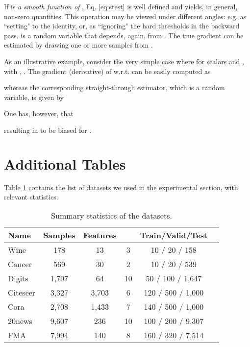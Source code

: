 \documentclass{article}
\begin{document}
If  is \emph{a smooth function of }, Eq. \ref{eq:stest} is well defined and yields, in general, non-zero quantities. This operation may be viewed under different angles: e.g. as ``setting"   to the identity, or, as ``ignoring" the hard thresholds in the backward pass.  is a random variable that depends, again, from . The true gradient  can be estimated by drawing one or more samples from . 

As an illustrative example, consider the very simple case where  for scalars  and , with , . The gradient (derivative) of  w.r.t.  can be easily computed as 

whereas the corresponding straight-through estimator, which is a random variable, is given by

One has, however, that 

resulting in  to be biased for .


\section{Additional Tables}

Table \ref{tb:data} contains the list of datasets we used in the experimental section, with relevant statistics.

\begin{table}[h]
\small
	\centering
	\vspace{-2mm}
	\caption{\label{tb:data}Summary statistics of the datasets.}
	\begin{tabular}{lccccc}
		\toprule Name & Samples & Features &  & Train/Valid/Test \\ \midrule
		Wine & 178 & 13 &  3 & 10 / 20 / 158 \\
		Cancer & 569 & 30 &  2 & 10 / 20 / 539 \\
		Digits & 1,797 & 64 &  10 & 50 / 100 / 1,647 \\
		Citeseer & 3,327 & 3,703 &  6 & 120 / 500 / 1,000 \\ 
		Cora & 2,708 & 1,433 &  7 & 140 / 500 / 1,000 \\
		20news & 9,607 & 236 &  10 & 100 / 200 / 9,307 \\
		FMA & 7,994 & 140 & 8 & 160 / 320 / 7,514 \\ \bottomrule
	\end{tabular}
	\vspace{-2mm}
\end{table}
\end{document}
